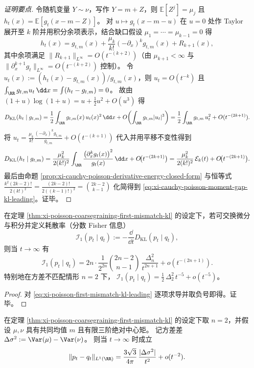 \begin{proof}[证明要点]
令随机变量 \(Y\sim\nu\)，写作 \(Y=m+Z\)，则 \(\mathbb E[Z^j]=\mu_j\) 且
\(
h_t(x)=\mathbb E[g_t(x-m-Z)]
\)。
对 \(u\mapsto g_t(x-m-u)\) 在 \(u=0\) 处作 Taylor 展开至 \(k\) 阶并用积分余项表示，结合缺口假设 \(\mu_1=\cdots=\mu_{k-1}=0\) 得
\[
h_t(x)=g_{t,m}(x)+\frac{\mu_k}{k!}(-\partial_x)^k g_{t,m}(x)+R_{k+1}(x),
\]
其中余项满足 \(\|R_{k+1}\|_{L^\infty}=O(t^{-(k+2)})\)（由 \(\mu_{k+1}<\infty\) 与 \(\|\partial_x^{k+1}g_t\|_{L^\infty}=O(t^{-(k+2)})\) 控制）。
令 \(u_t(x):=(h_t(x)-g_{t,m}(x))/g_{t,m}(x)\)，则 \(u_t=O(t^{-k})\) 且 \(\int_{\RR}g_{t,m}u_t\,\dd x=\int(h_t-g_{t,m})=0\)。
故由 \((1+u)\log(1+u)=u+\tfrac12u^2+O(u^3)\) 得
\[
D_{\mathrm{KL}}(h_t\mid g_{t,m})
=\frac12\int_{\RR} g_{t,m}(x)\,u_t(x)^2\,\dd x+O\!\left(\int_{\RR} g_{t,m}|u_t|^3\right)
=\frac12\int_{\RR} g_{t,m}\,u_t^2+O(t^{-(2k+1)}).
\]
将
\(
u_t=\frac{\mu_k}{k!}\frac{(-\partial_x)^k g_{t,m}}{g_{t,m}}+O(t^{-(k+1)})
\)
代入并用平移不变性得到
\[
D_{\mathrm{KL}}(h_t\mid g_{t,m})
=\frac{\mu_k^2}{2(k!)^2}\int_{\RR}\frac{\bigl(\partial_x^{k} g_t(x)\bigr)^2}{g_t(x)}\,\dd x
+O\!\bigl(t^{-(2k+1)}\bigr)
=\frac{\mu_k^2}{2(k!)^2}\,\mathcal{E}_k(t)+O\!\bigl(t^{-(2k+1)}\bigr).
\]
最后由命题 \ref{prop:xi-cauchy-poisson-derivative-energy-closed-form} 与恒等式
\(
\frac{k^2(2k-2)!}{2(k!)^2}
=\frac{(2k-2)!}{2((k-1)!)^2}
=\binom{2k-2}{k-1}
\)
化简得到 \eqref{eq:xi-cauchy-poisson-moment-gap-kl-leading}。证毕。
\end{proof}

\begin{corollary}\label{cor:xi-poisson-first-mismatch-dissipation-leading}
在定理 \ref{thm:xi-poisson-coarsegraining-first-mismatch-kl} 的设定下，若可交换微分与积分并定义耗散率（分数 Fisher 信息）
\[
\mathcal I_1(p_t\mid q_t):=-\frac{\dd}{\dd t}D_{\mathrm{KL}}(p_t\mid q_t),
\]
则当 \(t\to\infty\) 有
\[
\mathcal I_1(p_t\mid q_t)
=2n\cdot\frac{1}{2^{2n}}\binom{2n-2}{n-1}\,\frac{\Delta_n^2}{t^{2n+1}}+o(t^{-(2n+1)}).
\]
特别地在方差不匹配情形 \(n=2\) 下，
\(
\mathcal I_1(p_t\mid q_t)=\frac12\,\Delta_2^2\,t^{-5}+o(t^{-5})
\)。
\end{corollary}

\begin{proof}
对 \eqref{eq:xi-poisson-first-mismatch-kl-leading} 逐项求导并取负号即得。证毕。
\end{proof}

\begin{proposition}\label{prop:xi-poisson-variance-mismatch-tv-leading}
在定理 \ref{thm:xi-poisson-coarsegraining-first-mismatch-kl} 的设定下取 \(n=2\)，并假设 \(\mu,\nu\) 具有共同均值 \(m\) 且有限三阶绝对中心矩。
记方差差 \(\Delta\sigma^2:=\Var(\mu)-\Var(\nu)\)。
则当 \(t\to\infty\) 时成立
\[
\|p_t-q_t\|_{L^1(\RR)}
=\frac{3\sqrt3}{4\pi}\,\frac{|\Delta\sigma^2|}{t^2}+o(t^{-2}).
\]
\end{proposition}

